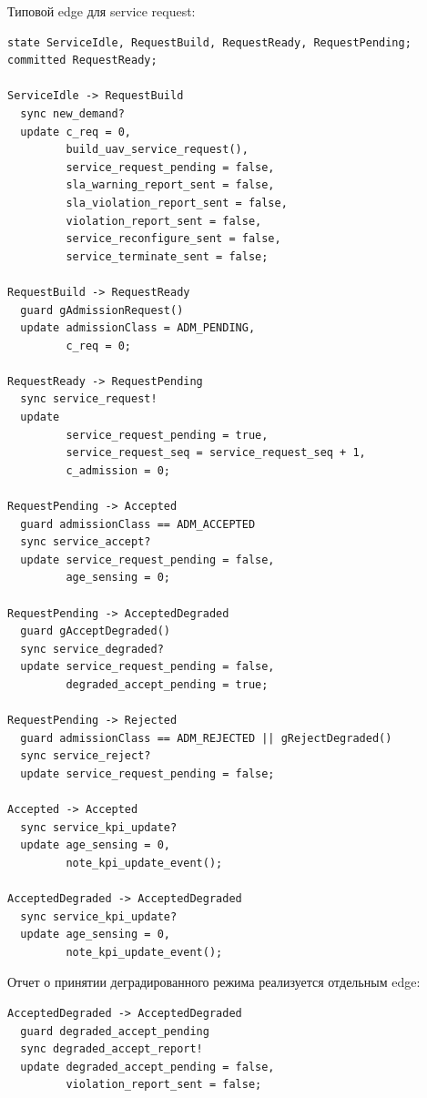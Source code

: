 \documentclass[10pt,a4paper]{article}
\begin{document}
Типовой edge для service request:
\begin{verbatim}
state ServiceIdle, RequestBuild, RequestReady, RequestPending;
committed RequestReady;

ServiceIdle -> RequestBuild
  sync new_demand?
  update c_req = 0,
         build_uav_service_request(),
         service_request_pending = false,
         sla_warning_report_sent = false,
         sla_violation_report_sent = false,
         violation_report_sent = false,
         service_reconfigure_sent = false,
         service_terminate_sent = false;

RequestBuild -> RequestReady
  guard gAdmissionRequest()
  update admissionClass = ADM_PENDING,
         c_req = 0;

RequestReady -> RequestPending
  sync service_request!
  update
         service_request_pending = true,
         service_request_seq = service_request_seq + 1,
         c_admission = 0;

RequestPending -> Accepted
  guard admissionClass == ADM_ACCEPTED
  sync service_accept?
  update service_request_pending = false,
         age_sensing = 0;

RequestPending -> AcceptedDegraded
  guard gAcceptDegraded()
  sync service_degraded?
  update service_request_pending = false,
         degraded_accept_pending = true;

RequestPending -> Rejected
  guard admissionClass == ADM_REJECTED || gRejectDegraded()
  sync service_reject?
  update service_request_pending = false;

Accepted -> Accepted
  sync service_kpi_update?
  update age_sensing = 0,
         note_kpi_update_event();

AcceptedDegraded -> AcceptedDegraded
  sync service_kpi_update?
  update age_sensing = 0,
         note_kpi_update_event();
\end{verbatim}

Отчет о принятии деградированного режима реализуется отдельным edge:
\begin{verbatim}
AcceptedDegraded -> AcceptedDegraded
  guard degraded_accept_pending
  sync degraded_accept_report!
  update degraded_accept_pending = false,
         violation_report_sent = false;
\end{verbatim}
\end{document}
